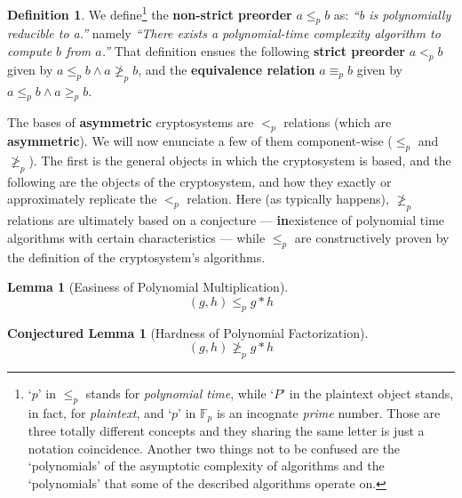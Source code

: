 \documentclass[a4paper,10pt]{article}
\theoremstyle{plain}
\theoremstyle{definition}
\newtheorem{defn}[thm]{Definition} %
\newtheorem{lemm}[thm]{Lemma} %
\newtheorem{clemm}[thm]{Conjectured Lemma} %
\theoremstyle{named}
\begin{document}
\begin{defn}
We define\footnote{`$p$' in $\leq_p$ stands for \textit{polynomial time}, while `$P$' in the plaintext object stands, in fact, for \textit{plaintext}, and `$p$' in $\mathbb{F}_p$ is an incognate \textit{prime} number. Those are three totally different concepts and they sharing the same letter is just a notation coincidence. Another two things not to be confused are the `polynomials' of the asymptotic complexity of algorithms and the `polynomials' that some of the described algorithms operate on.} the \textbf{non-strict preorder} $a \leq_p b$ as: \textit{``b is polynomially reducible to a.''} namely \textit{``There exists a polynomial-time complexity algorithm to compute $b$ from $a$.''} That definition ensues the following \textbf{strict preorder} $a <_p b$ given by $a \leq_p b \land a \ngeq_p b$, and the \textbf{equivalence relation} $a \equiv_p b$ given by $a \leq_p b \land a \geq_p b$.
\end{defn}

The bases of \textbf{asymmetric} cryptosystems are $<_p$ relations (which are \textbf{asymmetric}). We will now enunciate a few of them component-wise ($\leq_p$ and $\ngeq_p$). The first is the general objects in which the cryptosystem is based, and the following are the objects of the cryptosystem, and how they exactly or approximately replicate the $<_p$ relation. Here (as typically happens), $\ngeq_p$ relations are ultimately based on a conjecture --- \textbf{in}existence of polynomial time algorithms with certain characteristics --- while $\leq_p$ are constructively proven by the definition of the cryptosystem's algorithms.

\begin{lemm}[Easiness of Polynomial Multiplication]
\label{conj:polymulteasy}
\[(g,h) \leq_p g*h\]
\end{lemm}

\begin{clemm}[Hardness of Polynomial Factorization]
\label{conj:polyfacthard}
\[(g,h) \ngeq_p g*h\]
\end{clemm}
\end{document}
